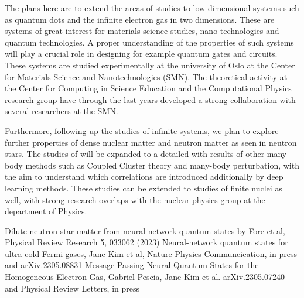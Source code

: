 \documentclass{article}
\begin{document}
The plans here are to extend the areas of studies to low-dimensional
systems such as quantum dots and the infinite electron gas in two
dimensions. These are systems of great interest for materials science
studies, nano-technologies and quantum technologies. A proper
understanding of the properties of such systems will play a crucial
role in designing for example quantum gates and circuits.
These systems are studied experimentally
at the university of Oslo at the Center for Materials Science and
Nanotechnologies (SMN). The theoretical activity at the Center for
Computing in Science Education and the Computational Physics research
group have through the last years developed a strong collaboration
with several researchers at the SMN. 


Furthermore, following up the studies of infinite systems, we plan to
explore further properties of dense nuclear matter and neutron matter
as seen in neutron stars. The studies of \cite{us2023a} will be
expanded to a detailed with results of other many-body methods such as
Coupled Cluster theory and many-body perturbation, with the aim to
understand which correlations are introduced additionally by deep
learning methods.  These studies can be extended to studies of finite nuclei as well, with strong research overlaps with the nuclear physics group at the department of Physics.

\begin{thebibliography}{99}

 Dilute neutron star matter from neural-network quantum states by Fore et al, Physical Review Research 5, 033062 (2023)
 Neural-network quantum states for ultra-cold Fermi gases, Jane Kim et al, Nature Physics Communcication, in press and arXiv.2305.08831
 Message-Passing Neural Quantum States for the Homogeneous Electron Gas, Gabriel Pescia, Jane Kim et al. arXiv.2305.07240 and Physical Review Letters, in press
\end{thebibliography}  
\end{document}
